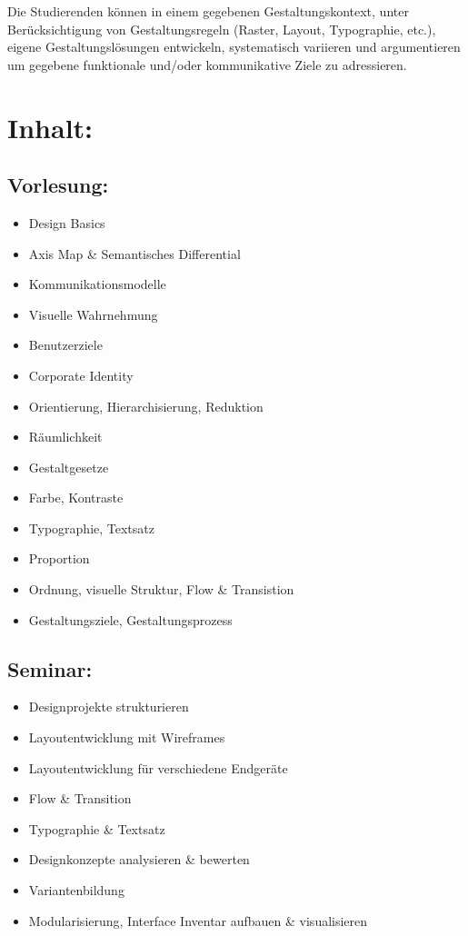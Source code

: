 Die Studierenden können in einem gegebenen Gestaltungskontext, unter
Berücksichtigung von Gestaltungsregeln (Raster, Layout, Typographie,
etc.), eigene Gestaltungslösungen entwickeln, systematisch variieren und
argumentieren um gegebene funktionale und/oder kommunikative Ziele zu
adressieren.

\section*{Inhalt:}\label{inhalt-21}

\subsection*{Vorlesung:}\label{vorlesung}

\begin{itemize}
\tightlist
\item
  Design Basics
\item
  Axis Map \& Semantisches Differential
\item
  Kommunikationsmodelle
\item
  Visuelle Wahrnehmung
\item
  Benutzerziele
\item
  Corporate Identity
\item
  Orientierung, Hierarchisierung, Reduktion
\item
  Räumlichkeit
\item
  Gestaltgesetze
\item
  Farbe, Kontraste
\item
  Typographie, Textsatz
\item
  Proportion
\item
  Ordnung, visuelle Struktur, Flow \& Transistion
\item
  Gestaltungsziele, Gestaltungsprozess
\end{itemize}

\subsection*{Seminar:}\label{seminar}

\begin{itemize}
\tightlist
\item
  Designprojekte strukturieren
\item
  Layoutentwicklung mit Wireframes
\item
  Layoutentwicklung für verschiedene Endgeräte
\item
  Flow \& Transition
\item
  Typographie \& Textsatz
\item
  Designkonzepte analysieren \& bewerten
\item
  Variantenbildung
\item
  Modularisierung, Interface Inventar aufbauen \& visualisieren
\end{itemize}

